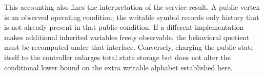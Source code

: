 This accounting also fixes the interpretation of the service result. A public vertex is an observed operating condition; the writable symbol records only history that is not already present in that public condition. If a different implementation makes additional inherited variables freely observable, the behavioral quotient must be recomputed under that interface. Conversely, charging the public state itself to the controller enlarges total state storage but does not alter the conditional lower bound on the extra writable alphabet established here.
